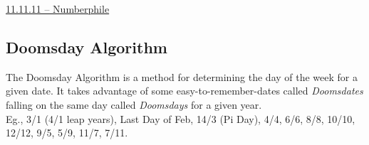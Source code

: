 \begin{funvideo}
\href{https://youtu.be/sPFWfAxIiwg}{11.11.11 -- Numberphile}
\end{funvideo}
\subsection{Doomsday Algorithm}
The Doomsday Algorithm is a method for determining the day of the week for a given date. It  takes advantage of some easy-to-remember-dates called \emph{Doomsdates} falling on the same day called \emph{Doomsdays} for a given year.\\
Eg., 3/1 (4/1 leap years), Last Day of Feb, 14/3 (Pi Day), 4/4, 6/6, 8/8, 10/10, 12/12, 9/5, 5/9, 11/7, 7/11.


